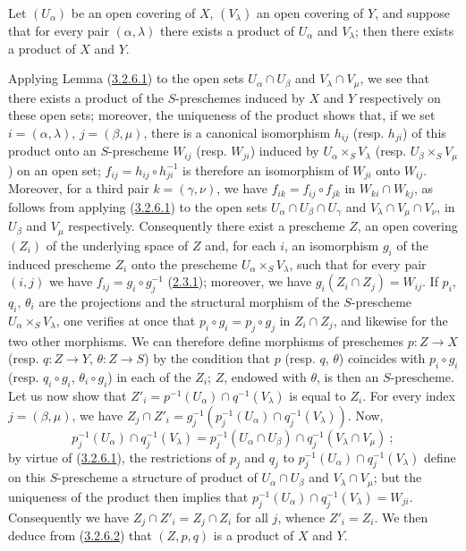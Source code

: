 \begin{lemma}[3.2.6.3]
\label{I.3.2.6.3}
Let $(U_\alpha)$ be an open covering of $X$, $(V_\lambda)$ an open
covering of $Y$, and suppose that for every pair
$(\alpha,\lambda)$ there exists a product of $U_\alpha$ and $V_\lambda$;
then there exists a product of $X$ and $Y$.
\end{lemma}

Applying Lemma (\hyperref[I.3.2.6.1]{3.2.6.1}) to the open sets
$U_\alpha\cap U_\beta$ and $V_\lambda\cap V_\mu$, we see that there exists a
product of the $S$-preschemes induced by $X$ and $Y$ respectively on these
open sets; moreover, the uniqueness of the product shows that, if we set
$i=(\alpha,\lambda)$, $j=(\beta,\mu)$, there is a canonical isomorphism
$h_{ij}$ (resp. $h_{ji}$) of this product onto an $S$-prescheme $W_{ij}$
(resp. $W_{ji}$) induced by $U_\alpha\times_S V_\lambda$
(resp. $U_\beta\times_S V_\mu$) on an open set;
$f_{ij}=h_{ij}\circ h_{ji}^{-1}$ is therefore an isomorphism of $W_{ji}$ onto
$W_{ij}$. Moreover, for a third pair $k=(\gamma,\nu)$, we have
$f_{ik}=f_{ij}\circ f_{jk}$ in $W_{ki}\cap W_{kj}$, as follows from
applying (\hyperref[I.3.2.6.1]{3.2.6.1}) to the open sets
$U_\alpha\cap U_\beta\cap U_\gamma$ and
$V_\lambda\cap V_\mu\cap V_\nu$, in $U_\beta$ and $V_\mu$
respectively. Consequently there exist a prescheme $Z$, an open covering
$(Z_i)$ of the underlying space of $Z$ and, for each $i$, an isomorphism $g_i$
of the induced prescheme $Z_i$ onto the prescheme
$U_\alpha\times_S V_\lambda$, such that for every pair $(i,j)$ we have
$f_{ij}=g_i\circ g_j^{-1}$
(\hyperref[I.2.3.1]{2.3.1}); moreover, we have
$g_i(Z_i\cap Z_j)=W_{ij}$. If $p_i$, $q_i$, $\theta_i$ are the projections
and the structural morphism of the $S$-prescheme
$U_\alpha\times_S V_\lambda$, one verifies at once that
$p_i\circ g_i=p_j\circ g_j$ in $Z_i\cap Z_j$, and likewise for the two
other morphisms. We can therefore define morphisms of preschemes
$p:Z\to X$ (resp. $q:Z\to Y$, $\theta:Z\to S$) by the condition that $p$
(resp. $q$, $\theta$) coincides with $p_i\circ g_i$
(resp. $q_i\circ g_i$, $\theta_i\circ g_i$) in each of the $Z_i$; $Z$,
endowed with $\theta$, is then an $S$-prescheme. Let us now show that
$Z'_i=p^{-1}(U_\alpha)\cap q^{-1}(V_\lambda)$ is equal to $Z_i$. For every
index $j=(\beta,\mu)$, we have
$Z_j\cap Z'_i=g_j^{-1}(p_j^{-1}(U_\alpha)\cap q_j^{-1}(V_\lambda))$. Now,
\[
  p_j^{-1}(U_\alpha)\cap q_j^{-1}(V_\lambda)
  =p_j^{-1}(U_\alpha\cap U_\beta)\cap
   q_j^{-1}(V_\lambda\cap V_\mu)~;
\]
by virtue of (\hyperref[I.3.2.6.1]{3.2.6.1}), the restrictions of $p_j$ and
$q_j$ to
$p_j^{-1}(U_\alpha)\cap q_j^{-1}(V_\lambda)$ define on this
$S$-prescheme a structure of product of $U_\alpha\cap U_\beta$ and
$V_\lambda\cap V_\mu$; but the uniqueness of the product then implies that
$p_j^{-1}(U_\alpha)\cap q_j^{-1}(V_\lambda)=W_{ji}$. Consequently we have
$Z_j\cap Z'_i=Z_j\cap Z_i$ for all $j$, whence $Z'_i=Z_i$. We then deduce
from (\hyperref[I.3.2.6.2]{3.2.6.2}) that $(Z,p,q)$ is a product of $X$ and
$Y$.

